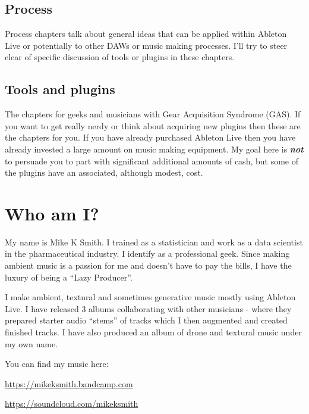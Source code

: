 \documentclass[
  12pt,
  letterpaper,
  oneside,
  open=any]{scrbook}
\begin{document}
\subsection*{Process}\label{process}

Process chapters talk about general ideas that can be applied within
Ableton Live or potentially to other DAWs or music making processes.
I'll try to steer clear of specific discussion of tools or plugins in
these chapters.

\subsection*{Tools and plugins}\label{tools-and-plugins}

The chapters for geeks and musicians with Gear Acquisition Syndrome
(GAS). If you want to get really nerdy or think about acquiring new
plugins then these are the chapters for you. If you have already
purchased Ableton Live then you have already invested a large amount on
music making equipment. My goal here is \textbf{\emph{not}} to persuade
you to part with significant additional amounts of cash, but some of the
plugins have an associated, although modest, cost.

\section*{Who am I?}\label{who-am-i}


My name is Mike K Smith. I trained as a statistician and work as a data
scientist in the pharmaceutical industry. I identify as a professional
geek. Since making ambient music is a passion for me and doesn't have to
pay the bills, I have the luxury of being a ``Lazy Producer''.

I make ambient, textural and sometimes generative music mostly using
Ableton Live. I have released 3 albums collaborating with other
musicians - where they prepared starter audio ``stems'' of tracks which
I then augmented and created finished tracks. I have also produced an
album of drone and textural music under my own name.

You can find my music here:

\url{https://mikeksmith.bandcamp.com}

\url{https://soundcloud.com/mikeksmith}
\end{document}
